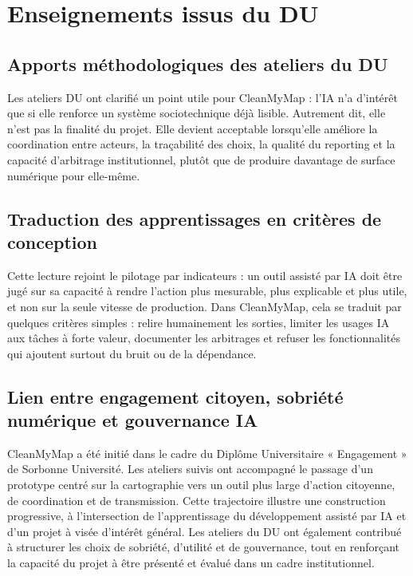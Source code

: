 \documentclass[
  10pt,
  a4paper,
  DIV=11,
  numbers=noendperiod,
  oneside]{scrreprt}
\begin{document}
\section{Enseignements issus du DU}\label{enseignements-issus-du-du}

\subsection{Apports méthodologiques des ateliers du
DU}\label{apports-muxe9thodologiques-des-ateliers-du-du}

Les ateliers DU ont clarifié un point utile pour CleanMyMap : l'IA n'a
d'intérêt que si elle renforce un système sociotechnique déjà lisible.
Autrement dit, elle n'est pas la finalité du projet. Elle devient
acceptable lorsqu'elle améliore la coordination entre acteurs, la
traçabilité des choix, la qualité du reporting et la capacité
d'arbitrage institutionnel, plutôt que de produire davantage de surface
numérique pour elle-même.

\subsection{Traduction des apprentissages en critères de
conception}\label{traduction-des-apprentissages-en-crituxe8res-de-conception}

Cette lecture rejoint le pilotage par indicateurs : un outil assisté par
IA doit être jugé sur sa capacité à rendre l'action plus mesurable, plus
explicable et plus utile, et non sur la seule vitesse de production.
Dans CleanMyMap, cela se traduit par quelques critères simples : relire
humainement les sorties, limiter les usages IA aux tâches à forte
valeur, documenter les arbitrages et refuser les fonctionnalités qui
ajoutent surtout du bruit ou de la dépendance.

\subsection{Lien entre engagement citoyen, sobriété numérique et
gouvernance
IA}\label{lien-entre-engagement-citoyen-sobriuxe9tuxe9-numuxe9rique-et-gouvernance-ia}

CleanMyMap a été initié dans le cadre du Diplôme Universitaire «
Engagement » de Sorbonne Université. Les ateliers suivis ont accompagné
le passage d'un prototype centré sur la cartographie vers un outil plus
large d'action citoyenne, de coordination et de transmission. Cette
trajectoire illustre une construction progressive, à l'intersection de
l'apprentissage du développement assisté par IA et d'un projet à visée
d'intérêt général. Les ateliers du DU ont également contribué à
structurer les choix de sobriété, d'utilité et de gouvernance, tout en
renforçant la capacité du projet à être présenté et évalué dans un cadre
institutionnel.
\end{document}
